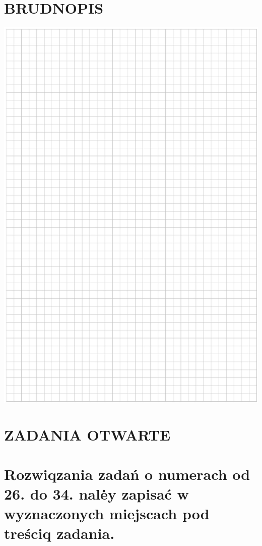 \documentclass[10pt]{article}
\begin{document}
\section*{BRUDNOPIS}
\begin{center}
\includegraphics[max width=\textwidth]{2024_11_21_dcf819de2d2eef051a0dg-09}
\end{center}

\section*{ZADANIA OTWARTE}
\section*{Rozwiqzania zadań o numerach od 26. do 34. nalė̇y zapisać w wyznaczonych miejscach pod treściq zadania.}
\end{document}
